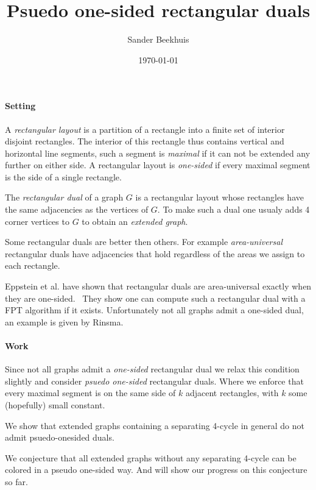 



\title{Psuedo one-sided rectangular duals}
\author{Sander Beekhuis}
\date{\today} %




\maketitle

\paragraph{Setting}

A \emph{rectangular layout} is a partition of a rectangle into a finite set of interior disjoint rectangles. The interior of this rectangle thus contains vertical and horizontal line segments, such a  segment is \emph{maximal} if it can not be extended any further on either side. A rectangular layout is \emph{one-sided} if every maximal segment is the side of a single rectangle.

The \emph{rectangular dual} of a graph $G$ is a rectangular layout whose rectangles have the same adjacencies as the vertices of $G$. To make such a dual one usualy adds 4 corner vertices to $G$ to obtain an \emph{extended graph}.

Some rectangular duals are better then others. For example \emph{area-universal} rectangular duals have adjacencies that hold regardless of the areas we assign to each rectangle.

Eppstein et al. have shown that rectangular duals are area-universal exactly when they are one-sided.~\cite{Eppstein2012} They show one can compute such a rectangular dual with a FPT algorithm if it exists. Unfortunately not all graphs admit a one-sided dual, an example is given by Rinsma.~\cite{Rinsma1987}

\paragraph{Work}
Since not all graphs admit a \emph{one-sided} rectangular dual we relax this condition slightly and consider \emph{psuedo one-sided} rectangular duals. Where we enforce that every maximal segment is on the same side of $k$ adjacent rectangles, with $k$ some (hopefully) small constant.

We show that extended graphs containing a separating 4-cycle in general do not admit psuedo-onesided duals.

We conjecture that all extended graphs without any separating 4-cycle can be colored in a pseudo one-sided way. And will show our progress on this conjecture so far.

\printbibliography


